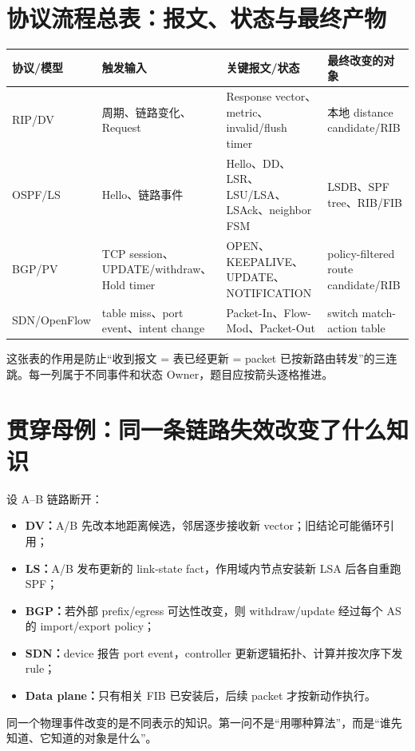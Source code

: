 \documentclass[11pt,a4paper]{ctexart}
\newcommand{\kw}[1]{\textbf{\color{deep}#1}}
\begin{document}
\section{协议流程总表：报文、状态与最终产物}

\begin{center}\small
\begin{tabularx}{\linewidth}{L{2.2cm}L{3.1cm}L{3.0cm}Y}
\toprule
协议/模型 & 触发输入 & 关键报文/状态 & 最终改变的对象\\
\midrule
RIP/DV & 周期、链路变化、Request & Response vector、metric、invalid/flush timer & 本地 distance candidate/RIB\\
OSPF/LS & Hello、链路事件 & Hello、DD、LSR、LSU/LSA、LSAck、neighbor FSM & LSDB、SPF tree、RIB/FIB\\
BGP/PV & TCP session、UPDATE/withdraw、Hold timer & OPEN、KEEPALIVE、UPDATE、NOTIFICATION & policy-filtered route candidate/RIB\\
SDN/OpenFlow & table miss、port event、intent change & Packet-In、Flow-Mod、Packet-Out & switch match-action table\\
\bottomrule
\end{tabularx}\end{center}

这张表的作用是防止“收到报文 = 表已经更新 = packet 已按新路由转发”的三连跳。每一列属于不同事件和状态 Owner，题目应按箭头逐格推进。

\section{贯穿母例：同一条链路失效改变了什么知识}

设 A--B 链路断开：
\begin{itemize}
  \item \kw{DV：}A/B 先改本地距离候选，邻居逐步接收新 vector；旧结论可能循环引用；
  \item \kw{LS：}A/B 发布更新的 link-state fact，作用域内节点安装新 LSA 后各自重跑 SPF；
  \item \kw{BGP：}若外部 prefix/egress 可达性改变，则 withdraw/update 经过每个 AS 的 import/export policy；
  \item \kw{SDN：}device 报告 port event，controller 更新逻辑拓扑、计算并按次序下发 rule；
  \item \kw{Data plane：}只有相关 FIB 已安装后，后续 packet 才按新动作执行。
\end{itemize}
同一个物理事件改变的是不同表示的知识。第一问不是“用哪种算法”，而是“谁先知道、它知道的对象是什么”。
\end{document}
